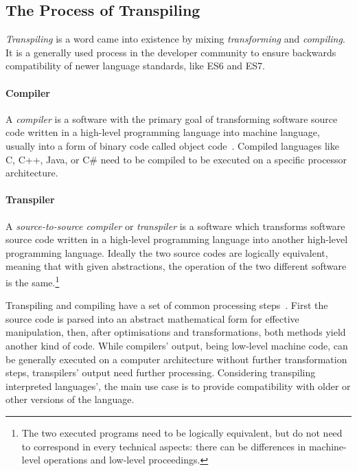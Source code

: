 \subsection{The Process of Transpiling}

\emph{Transpiling} is a word came into existence by mixing \emph{transforming} and \emph{compiling}. It is a generally used process in the \es developer community to ensure backwards compatibility of newer \es language standards, like ES6 and ES7.

\paragraph{Compiler}

A \emph{compiler} is a software with the primary goal of transforming software source code written in a high-level programming language into machine language, usually into a form of binary code called object code~\cite{pcmagcompilers}. Compiled languages like C, C++, Java, or C\# need to be compiled to be executed on a specific processor architecture.

\paragraph{Transpiler}

A \emph{source-to-source compiler} or \emph{transpiler} is a software which transforms software source code written in a high-level programming language into another high-level programming language. Ideally the two source codes are logically equivalent, meaning that with given abstractions, the operation of the two different software is the same.\footnote{The two executed programs need to be logically equivalent, but do not need to correspond in every technical aspects: there can be differences in machine-level operations and low-level proceedings.}

Transpiling and compiling have a set of common processing steps~\cite{kulkarnitranspiler}. First the source code is parsed into an abstract mathematical form for effective manipulation, then, after optimisations and transformations, both methods yield another kind of code. While compilers' output, being low-level machine code, can be generally executed on a computer architecture without further transformation steps, transpilers' output need further processing. Considering transpiling interpreted languages', the main use case is to provide compatibility with older or other versions of the language.

